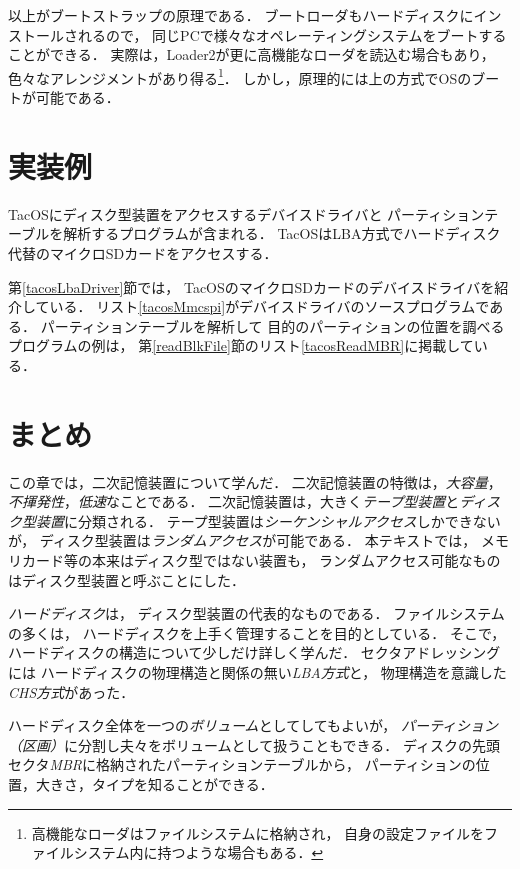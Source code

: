 以上がブートストラップの原理である．
ブートローダもハードディスクにインストールされるので，
同じPCで様々なオペレーティングシステムをブートすることができる．
実際は，Loader2が更に高機能なローダを読込む場合もあり，
色々なアレンジメントがあり得る\footnote{
  高機能なローダはファイルシステムに格納され，
  自身の設定ファイルをファイルシステム内に持つような場合もある．}．
しかし，原理的には上の方式でOSのブートが可能である．

\section{実装例}
TacOSにディスク型装置をアクセスするデバイスドライバと
パーティションテーブルを解析するプログラムが含まれる．
TacOSはLBA方式でハードディスク代替のマイクロSDカードをアクセスする．

第\ref{tacosLbaDriver}節では，
TacOSのマイクロSDカードのデバイスドライバを紹介している．
リスト\ref{tacosMmcspi}がデバイスドライバのソースプログラムである．
パーティションテーブルを解析して
目的のパーティションの位置を調べるプログラムの例は，
第\ref{readBlkFile}節のリスト\ref{tacosReadMBR}に掲載している．

\section{まとめ}
この章では，二次記憶装置について学んだ．
二次記憶装置の特徴は，\emph{大容量}，
\emph{不揮発性}，\emph{低速}なことである．
二次記憶装置は，大きく\emph{テープ型装置}と\emph{ディスク型装置}に分類される．
テープ型装置は\emph{シーケンシャルアクセス}しかできないが，
ディスク型装置は\emph{ランダムアクセス}が可能である．
本テキストでは，
メモリカード等の本来はディスク型ではない装置も，
ランダムアクセス可能なものはディスク型装置と呼ぶことにした．

\emph{ハードディスク}は，
ディスク型装置の代表的なものである．
ファイルシステムの多くは，
ハードディスクを上手く管理することを目的としている．
そこで，ハードディスクの構造について少しだけ詳しく学んだ．
セクタアドレッシングには
ハードディスクの物理構造と関係の無い\emph{LBA方式}と，
物理構造を意識した\emph{CHS方式}があった．

ハードディスク全体を一つの\emph{ボリューム}としてしてもよいが，
\emph{パーティション（区画）}に分割し夫々をボリュームとして扱うこともできる．
ディスクの先頭セクタ\emph{MBR}に格納されたパーティションテーブルから，
パーティションの位置，大きさ，タイプを知ることができる．

